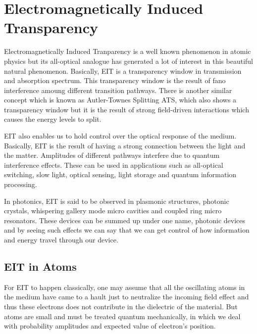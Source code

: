 \section{Electromagnetically Induced Transparency}
Electromagnetically Induced Tranparency is a well known phenomenon in atomic physics but its all-optical analogue has generated a lot of interest in this beautiful natural phenomenon. Basically, EIT is a transparency window in transmission and absorption spectrum. This transparency window is the result of fano interference amoung different transition pathways. There is another similar concept which is known as Autler-Townes Splitting ATS, which also shows a transparency window but it is the result of strong field-driven interactions which causes the energy levels to split.

EIT also enables us to hold control over the optical response of the medium. Basically, EIT is the result of having a strong connection between the light and the matter. Amplitudes of different pathways interfere due to quantum interference effects. These can be used in applications such as all-optical switching, slow light, optical sensing, light storage and quantum information processing.

In photonics, EIT is said to be observed in plasmonic structures, photonic crystals, whispering gallery mode micro cavities and coupled ring micro resonators. These devices can be summed up under one name, photonic devices and by seeing such effects we can say that we can get control of how information and energy travel through our device.

\subsection{EIT in Atoms}
For EIT to happen classically, one may assume that all the oscillating atoms in the medium have came to a hault just to neutralize the incoming field effect and thus these electrons does not contribute in the dielectric of the material. But atoms are small and must be treated quantum mechanically, in which we deal with probability amplitudes and expected value of electron's position. 
